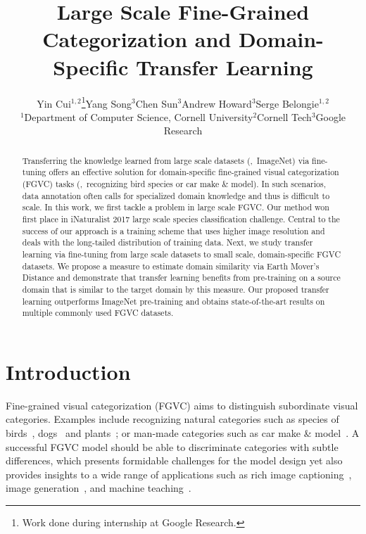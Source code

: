 \documentclass[10pt,twocolumn,letterpaper]{article}
\begin{document}
\title{Large Scale Fine-Grained Categorization and Domain-Specific Transfer Learning}

\author{Yin Cui$^{1,2}$\thanks{Work done during internship at Google Research.}\hspace{15pt}Yang Song$^{3}$\hspace{15pt}Chen Sun$^{3}$\hspace{15pt}Andrew Howard$^{3}$\hspace{15pt}Serge Belongie$^{1,2}$\\
$^{1}$Department of Computer Science, Cornell University\hspace{20pt}$^{2}$Cornell Tech\hspace{20pt}$^{3}$Google Research}


\maketitle


\begin{abstract}
Transferring the knowledge learned from large scale datasets (\eg,\ ImageNet) via fine-tuning offers an effective solution for domain-specific fine-grained visual categorization (FGVC) tasks (\eg,\ recognizing bird species or car make \& model).
In such scenarios, data annotation often calls for specialized domain knowledge and thus is difficult to scale.
In this work, we first tackle a problem in large scale FGVC. 
Our method won first place in iNaturalist 2017 large scale species classification challenge.
Central to the success of our approach is a training scheme that uses higher image resolution and deals with the long-tailed distribution of training data.
Next, we study transfer learning via fine-tuning from large scale datasets to small scale, domain-specific FGVC datasets.
We propose a measure to estimate domain similarity via Earth Mover's Distance and demonstrate that transfer learning benefits from pre-training on a source domain that is similar to the target domain by this measure. 
Our proposed transfer learning outperforms ImageNet pre-training and obtains state-of-the-art results on multiple commonly used FGVC datasets.
\end{abstract}


\section{Introduction}

Fine-grained visual categorization (FGVC) aims to distinguish subordinate visual categories. 
Examples include recognizing natural categories such as species of birds~\cite{cub200, nabirds}, dogs~\cite{stanford_dog} and plants~\cite{flower_102, urban_tree}; or man-made categories such as car make \& model~\cite{stanford_car, CompCars}.
A successful FGVC model should be able to discriminate categories with subtle differences, which presents formidable challenges for the model design yet also provides insights to a wide range of applications such as rich image captioning~\cite{anne2016deep}, image generation~\cite{CVAE-GAN}, and machine teaching~\cite{becoming_expert, mac2018teaching}.
\end{document}
